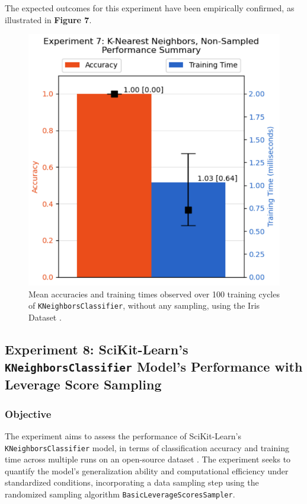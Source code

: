 \documentclass{article}
\theoremstyle{plain}
\theoremstyle{definition}
\theoremstyle{remark}
\begin{document}
The expected outcomes for this experiment have been empirically confirmed, as illustrated in \textbf{Figure 7}.

\begin{figure}[ht]
	\vskip 0.2in
	\begin{center}
		\centerline{\includegraphics[width=\columnwidth]{experiment_07}}
		\caption{Mean accuracies and training times observed over 100 training cycles of \texttt{KNeighborsClassifier}, without any sampling, using the Iris Dataset \cite{iris}.}
		\label{experiment_07}
	\end{center}
	\vskip -0.2in
\end{figure}


\subsection{Experiment 8: SciKit-Learn's \texttt{KNeighborsClassifier} Model's Performance with Leverage Score Sampling}

\subsubsection{Objective}

The experiment aims to assess the performance of SciKit-Learn's \texttt{KNeighborsClassifier} model, in terms of classification accuracy and training time across multiple runs on an open-source dataset \cite{iris}. The experiment seeks to quantify the model's generalization ability and computational efficiency under standardized conditions, incorporating a data sampling step using the randomized sampling algorithm \texttt{BasicLeverageScoresSampler}.
\end{document}
